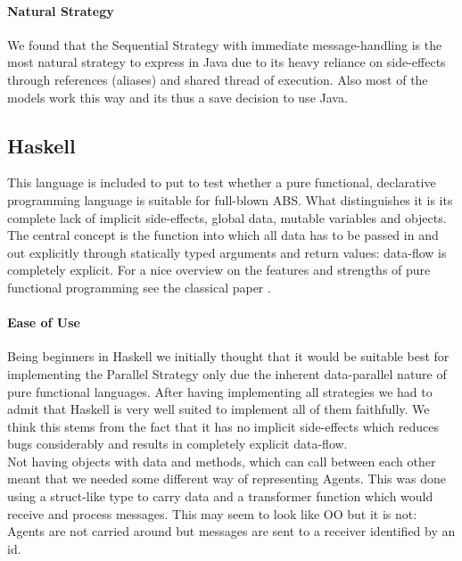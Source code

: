 \paragraph{Natural Strategy}
We found that the Sequential Strategy with immediate message-handling is the most natural strategy to express in Java due to its heavy reliance on side-effects through references (aliases) and shared thread of execution. Also most of the models work this way and its thus a save decision to use Java.





 
\subsection{Haskell}
This language is included to put to test whether a pure functional, declarative programming language is suitable for full-blown ABS. What distinguishes it is its complete lack of implicit side-effects, global data, mutable variables and objects. The central concept is the function into which all data has to be passed in and out explicitly through statically typed arguments and return values: data-flow is completely explicit. For a nice overview on the features and strengths of pure functional programming see the classical paper  \cite{hughes_why_1989}.

\paragraph{Ease of Use}
Being beginners in Haskell we initially thought that it would be suitable best for implementing the Parallel Strategy only due the inherent data-parallel nature of pure functional languages. After having implementing all strategies we had to admit that Haskell is very well suited to implement all of them faithfully. We think this stems from the fact that it has no implicit side-effects which reduces bugs considerably and results in completely explicit data-flow. \\

Not having objects with data and methods, which can call between each other meant that we needed some different way of representing Agents. This was done using a struct-like type to carry data and a transformer function which would receive and process messages. This may seem to look like OO but it is not: Agents are not carried around but messages are sent to a receiver identified by an id.


